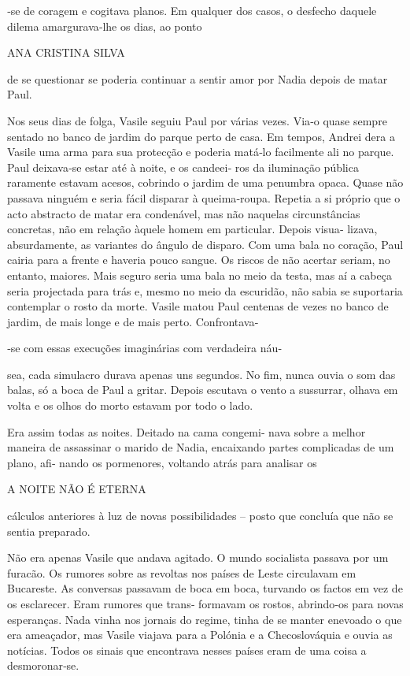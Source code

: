 ‑se de coragem e cogitava planos. Em qualquer dos casos, o desfecho
daquele dilema amargurava‑lhe os dias, ao ponto

ANA CRISTINA SILVA

de se questionar se poderia continuar a sentir amor por Nadia depois de
matar Paul.

Nos seus dias de folga, Vasile seguiu Paul por várias vezes. Via‑o quase
sempre sentado no banco de jardim do parque perto de casa. Em tempos,
Andrei dera a Vasile uma arma para sua protecção e poderia matá‑lo
facilmente ali no parque. Paul deixava‑se estar até à noite, e os
candeei‑ ros da iluminação pública raramente estavam acesos, cobrindo o
jardim de uma penumbra opaca. Quase não passava ninguém e seria fácil
disparar à queima‑roupa. Repetia a si próprio que o acto abstracto de
matar era condenável, mas não naquelas circunstâncias concretas, não em
relação àquele homem em particular. Depois visua‑ lizava, absurdamente,
as variantes do ângulo de disparo. Com uma bala no coração, Paul cairia
para a frente e haveria pouco sangue. Os riscos de não acertar seriam,
no entanto, maiores. Mais seguro seria uma bala no meio da testa, mas aí
a cabeça seria projectada para trás e, mesmo no meio da escuridão, não
sabia se suportaria contemplar o rosto da morte. Vasile matou Paul
centenas de vezes no banco de jardim, de mais longe e de mais perto.
Confrontava‑

‑se com essas execuções imaginárias com verdadeira náu‑

sea, cada simulacro durava apenas uns segundos. No fim, nunca ouvia o
som das balas, só a boca de Paul a gritar. Depois escutava o vento a
sussurrar, olhava em volta e os olhos do morto estavam por todo o lado.

Era assim todas as noites. Deitado na cama congemi‑ nava sobre a melhor
maneira de assassinar o marido de Nadia, encaixando partes complicadas
de um plano, afi‑ nando os pormenores, voltando atrás para analisar os

A NOITE NÃO É ETERNA

cálculos anteriores à luz de novas possibilidades -- posto que concluía
que não se sentia preparado.

Não era apenas Vasile que andava agitado. O mundo socialista passava por
um furacão. Os rumores sobre as revoltas nos países de Leste circulavam
em Bucareste. As conversas passavam de boca em boca, turvando os factos
em vez de os esclarecer. Eram rumores que trans‑ formavam os rostos,
abrindo‑os para novas esperanças. Nada vinha nos jornais do regime,
tinha de se manter enevoado o que era ameaçador, mas Vasile viajava para
a Polónia e a Checoslováquia e ouvia as notícias. Todos os sinais que
encontrava nesses países eram de uma coisa a desmoronar‑se.

